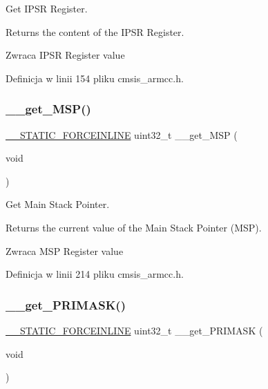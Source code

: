 Get I\+P\+SR Register. 

Returns the content of the I\+P\+SR Register. \begin{DoxyReturn}{Zwraca}
I\+P\+SR Register value 
\end{DoxyReturn}


Definicja w linii 154 pliku cmsis\+\_\+armcc.\+h.

\mbox{\label{group___c_m_s_i_s___core___reg_acc_functions_ga667e7b8b97b4a30f445ae45d37588e45}} 
\subsubsection{\texorpdfstring{\+\_\+\+\_\+get\+\_\+\+M\+S\+P()}{\_\_get\_MSP()}}
{\footnotesize\ttfamily \hyperlink{cmsis__iccarm_8h_ab904513442afdf77d4f8c74f23cbb040}{\+\_\+\+\_\+\+S\+T\+A\+T\+I\+C\+\_\+\+F\+O\+R\+C\+E\+I\+N\+L\+I\+NE} uint32\+\_\+t \+\_\+\+\_\+get\+\_\+\+M\+SP (\begin{DoxyParamCaption}\item[{void}]{ }\end{DoxyParamCaption})}



Get Main Stack Pointer. 

Returns the current value of the Main Stack Pointer (M\+SP). \begin{DoxyReturn}{Zwraca}
M\+SP Register value 
\end{DoxyReturn}


Definicja w linii 214 pliku cmsis\+\_\+armcc.\+h.

\mbox{\label{group___c_m_s_i_s___core___reg_acc_functions_ga4ff59fb9e280d19e79e6875863a65f0a}} 
\subsubsection{\texorpdfstring{\+\_\+\+\_\+get\+\_\+\+P\+R\+I\+M\+A\+S\+K()}{\_\_get\_PRIMASK()}}
{\footnotesize\ttfamily \hyperlink{cmsis__iccarm_8h_ab904513442afdf77d4f8c74f23cbb040}{\+\_\+\+\_\+\+S\+T\+A\+T\+I\+C\+\_\+\+F\+O\+R\+C\+E\+I\+N\+L\+I\+NE} uint32\+\_\+t \+\_\+\+\_\+get\+\_\+\+P\+R\+I\+M\+A\+SK (\begin{DoxyParamCaption}\item[{void}]{ }\end{DoxyParamCaption})}



